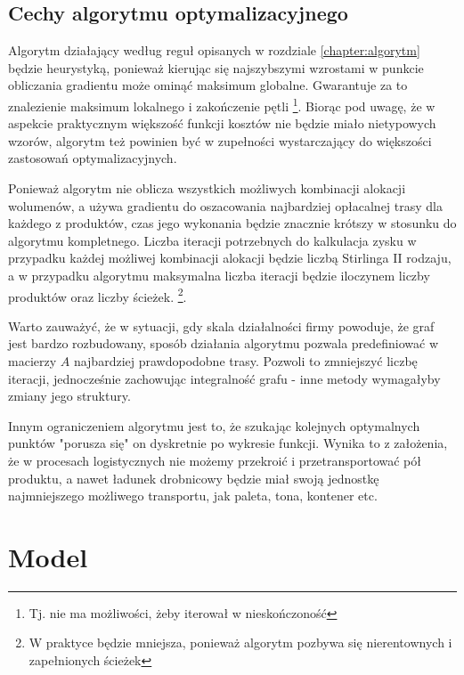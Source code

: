 \documentclass[polish, twoside, 12pt, a4paper]{article}
\theoremstyle{definition}
\theoremstyle{plain}
\theoremstyle{remark}
\begin{document}
\subsection{Cechy algorytmu optymalizacyjnego}

Algorytm działający według reguł opisanych w rozdziale \ref{chapter:algorytm} będzie heurystyką, ponieważ kierując się najszybszymi wzrostami w punkcie obliczania gradientu może ominąć maksimum globalne. Gwarantuje za to znalezienie maksimum lokalnego i zakończenie pętli \footnote{Tj. nie ma możliwości, żeby iterował w nieskończoność}. Biorąc pod uwagę, że w aspekcie praktycznym większość funkcji kosztów nie będzie miało nietypowych wzorów, algorytm też powinien być w zupełności wystarczający do większości zastosowań optymalizacyjnych.

Ponieważ algorytm nie oblicza wszystkich możliwych kombinacji alokacji wolumenów, a używa gradientu do oszacowania najbardziej opłacalnej trasy dla każdego z produktów, czas jego wykonania będzie znacznie krótszy w stosunku do algorytmu kompletnego. Liczba iteracji potrzebnych do kalkulacja zysku w przypadku każdej możliwej kombinacji alokacji będzie liczbą Stirlinga II rodzaju, a w przypadku algorytmu maksymalna liczba iteracji będzie iloczynem liczby produktów oraz liczby ścieżek. \footnote{W praktyce będzie mniejsza, ponieważ algorytm pozbywa się nierentownych i zapełnionych ścieżek}. 

Warto zauważyć, że w sytuacji, gdy skala działalności firmy powoduje, że graf jest bardzo rozbudowany, sposób działania algorytmu pozwala predefiniować w macierzy $A$ najbardziej prawdopodobne trasy. Pozwoli to zmniejszyć liczbę iteracji, jednocześnie zachowując integralność grafu - inne metody wymagałyby zmiany jego struktury.

Innym ograniczeniem algorytmu jest to, że szukając kolejnych optymalnych punktów "porusza się" on dyskretnie po wykresie funkcji. Wynika to z założenia, że w procesach logistycznych nie możemy przekroić i przetransportować pół produktu, a nawet ładunek drobnicowy będzie miał swoją jednostkę najmniejszego możliwego transportu, jak paleta, tona, kontener etc. 

\clearpage

\section{Model} \label{chapter:model}
\end{document}
